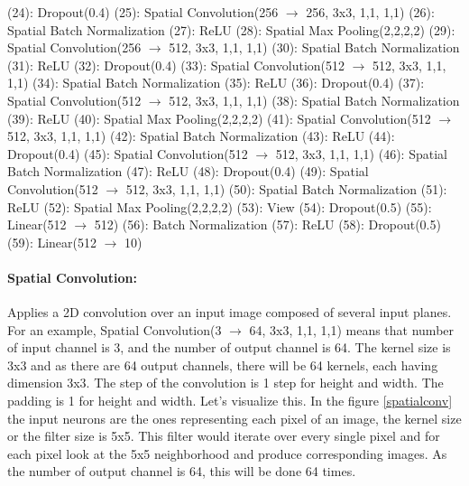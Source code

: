   (24): Dropout(0.4) \hfill\break
  (25): Spatial Convolution(256 \(\rightarrow\) 256, 3x3, 1,1, 1,1) \hfill\break
  (26): Spatial Batch Normalization \hfill\break
  (27): ReLU \hfill\break
  (28): Spatial Max Pooling(2,2,2,2) \hfill\break
  (29): Spatial Convolution(256 \(\rightarrow\) 512, 3x3, 1,1, 1,1) \hfill\break
  (30): Spatial Batch Normalization \hfill\break
  (31): ReLU \hfill\break
  (32): Dropout(0.4) \hfill\break
  (33): Spatial Convolution(512 \(\rightarrow\) 512, 3x3, 1,1, 1,1) \hfill\break
  (34): Spatial Batch Normalization \hfill\break
  (35): ReLU \hfill\break
  (36): Dropout(0.4) \hfill\break
  (37): Spatial Convolution(512 \(\rightarrow\) 512, 3x3, 1,1, 1,1) \hfill\break
  (38): Spatial Batch Normalization \hfill\break
  (39): ReLU \hfill\break
  (40): Spatial Max Pooling(2,2,2,2) \hfill\break
  (41): Spatial Convolution(512 \(\rightarrow\) 512, 3x3, 1,1, 1,1) \hfill\break
  (42): Spatial Batch Normalization \hfill\break
  (43): ReLU \hfill\break
  (44): Dropout(0.4) \hfill\break
  (45): Spatial Convolution(512 \(\rightarrow\) 512, 3x3, 1,1, 1,1) \hfill\break
  (46): Spatial Batch Normalization \hfill\break
  (47): ReLU \hfill\break
  (48): Dropout(0.4) \hfill\break
  (49): Spatial Convolution(512 \(\rightarrow\) 512, 3x3, 1,1, 1,1) \hfill\break
  (50): Spatial Batch Normalization \hfill\break
  (51): ReLU \hfill\break
  (52): Spatial Max Pooling(2,2,2,2) \hfill\break
  (53): View \hfill\break
  (54): Dropout(0.5) \hfill\break
  (55): Linear(512 \(\rightarrow\) 512) \hfill\break
  (56): Batch Normalization \hfill\break
  (57): ReLU \hfill\break
  (58): Dropout(0.5) \hfill\break
  (59): Linear(512 \(\rightarrow\) 10) \hfill\break
  
  
  \paragraph{Spatial Convolution:}
  
  Applies a 2D convolution over an input image composed of several input planes. For an example, Spatial Convolution(3 \(\rightarrow\) 64, 3x3, 1,1, 1,1) means that number of input channel is 3, and the number of output channel is 64. The kernel size is 3x3 and as there are 64 output channels, there will be 64 kernels, each having dimension 3x3. The step of the convolution is 1 step for height and width. The padding is 1 for height and width. Let's visualize this. In the figure \ref{spatialconv} the input neurons are the ones representing each pixel of an image, the kernel size or the filter size is 5x5. This filter would iterate over every single pixel and for each pixel look at the 5x5 neighborhood and produce corresponding images. As the number of output channel is 64, this will be done 64 times.
  
